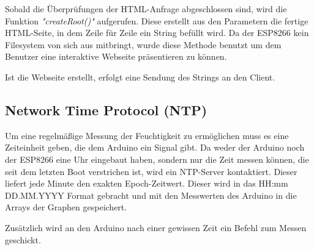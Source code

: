 Sobald die Überprüfungen der HTML-Anfrage abgeschlossen sind, wird die Funktion \textit{"createRoot()"}
aufgerufen. Diese erstellt aus den Parametern die fertige HTML-Seite, in dem Zeile für Zeile
ein String befüllt wird. Da der ESP8266 kein Filesystem von sich aus mitbringt, wurde diese
Methode benutzt um dem Benutzer eine interaktive Webseite präsentieren zu können.

Ist die Webseite erstellt, erfolgt eine Sendung des Strings an den Client.

\subsection{Network Time Protocol (NTP)}
Um eine regelmäßige Messung der Feuchtigkeit zu ermöglichen muss es eine Zeiteinheit geben,
die dem Arduino ein Signal gibt. Da weder der Arduino noch der ESP8266 eine Uhr eingebaut haben,
sondern nur die Zeit messen können, die seit dem letzten Boot verstrichen ist, wird ein NTP-Server
kontaktiert.
Dieser liefert jede Minute den exakten Epoch-Zeitwert. Dieser wird in das HH:mm DD.MM.YYYY Format
gebracht und mit den Messwerten des Arduino in die Arrays der Graphen gespeichert.

Zusätzlich wird an den Arduino nach einer gewissen Zeit ein Befehl zum Messen geschickt.